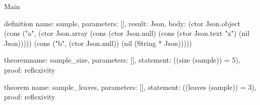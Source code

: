 \begin{lexlean}{Main}
\begin{semanticmodule}
definition{
  name: sample,
  parameters: [],
  result: Json,
  body: (ctor Json.object (cons ("a", (ctor Json.array (cons (ctor Json.null) (cons (ctor Json.text "x") (nil Json))))) (cons ("b", (ctor Json.null)) (nil (String * Json)))))
}

theorem{name: sample_size, parameters: [], statement: ((size (sample)) = 5), proof: reflexivity{}}

theorem{
  name: sample_leaves,
  parameters: [],
  statement: ((leaves (sample)) = 3),
  proof: reflexivity{}
}
\end{semanticmodule}
\end{lexlean}
